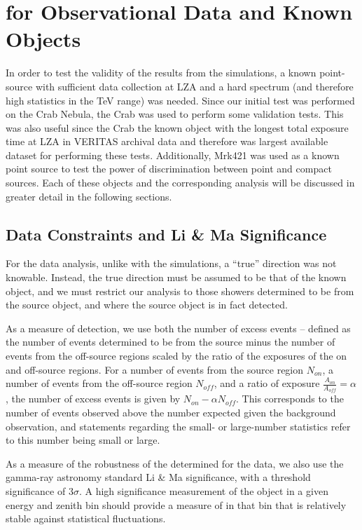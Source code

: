 \documentclass[main.tex]{subfiles}
\begin{document}
\section{\rse for Observational Data and Known Objects}
In order to test the validity of the results from the simulations, a known point-source with sufficient data collection at LZA and a hard spectrum (and therefore high statistics in the TeV range) was needed. Since our initial test was performed on the Crab Nebula, the Crab was used to perform some validation tests. This was also useful since the Crab the known object with the longest total exposure time at LZA in VERITAS archival data and therefore was largest available dataset for performing these tests. Additionally, Mrk421 \cite{mrk421} was used as a known point source to test the power of discrimination between point and compact sources. Each of these objects and the corresponding analysis will be discussed in greater detail in the following sections.

\subsection{Data Constraints and Li \& Ma Significance}
\label{li_ma_defn}
For the data analysis, unlike with the simulations, a ``true'' direction was not knowable. Instead, the true direction must be assumed to be that of the known object, and we must restrict our analysis to those showers determined to be from the source object, and where the source object is in fact detected.

As a measure of detection, we use both the number of excess events -- defined as the number of events determined to be from the source minus the number of events from the off-source regions scaled by the ratio of the exposures of the on and off-source regions. For a number of events from the source region $N_{on}$, a number of events from the off-source region $N_{off}$, and a ratio of exposure $\frac{A_{on}}{A_{off}}=\alpha$, the number of excess events is given by $N_{on}-\alpha N_{off}$. This corresponds to the number of events observed above the number expected given the background observation, and statements regarding the small- or large-number statistics refer to this number being small or large.

As a measure of the robustness of the \rse determined for the data, we also use the gamma-ray astronomy standard Li \& Ma \cite{LiMa} significance, with a threshold significance of $3\sigma$. A high significance measurement of the object in a given energy and zenith bin should provide a measure of \rse in that bin that is relatively stable against statistical fluctuations.
\end{document}
